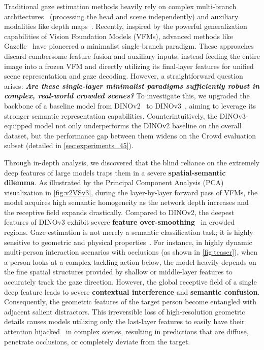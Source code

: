 \documentclass[sigconf,review,anonymous,screen]{acmart}
\begin{document}
Traditional gaze estimation methods heavily rely on complex multi-branch architectures~\cite{chong2020detecting,chen2021gaze,saran2018human,hu2022gaze,recasens2017following,wang2022gatector,zhao2020learning} (processing the head and scene independently) and auxiliary modalities like depth maps~\cite{bao2022escnet,horanyi2023they,tonini2022multimodal,guan2019enhanced}. Recently, inspired by the powerful generalization capabilities of Vision Foundation Models (VFMs), advanced methods like Gazelle~\cite{ryan2025gaze} have pioneered a minimalist single-branch paradigm. These approaches discard cumbersome feature fusion and auxiliary inputs, instead feeding the entire image into a frozen VFM and directly utilizing its final-layer features for unified scene representation and gaze decoding. However, a straightforward question arises: \textbf{\textit{Are these single-layer minimalist paradigms sufficiently robust in complex, real-world crowded scenes?}} To investigate this, we upgraded the backbone of a baseline model from DINOv2~\cite{oquab2023dinov2} to DINOv3~\cite{simeoni2025dinov3}, aiming to leverage its stronger semantic representation capabilities. Counterintuitively, the DINOv3-equipped model not only underperforms the DINOv2 baseline on the overall dataset, but the performance gap between them widens on the Crowd evaluation subset (detailed in \autoref{sec:experiments_45}).

Through in-depth analysis, we discovered that the blind reliance on the extremely deep features of large models traps them in a severe \textbf{spatial-semantic dilemma}. As illustrated by the Principal Component Analysis (PCA) visualization in \autoref{fig:v2VSv3}, during the layer-by-layer forward pass of VFMs, the model acquires high semantic homogeneity as the network depth increases and the receptive field expands drastically. Compared to DINOv2, the deepest features of DINOv3 exhibit severe \textbf{feature over-smoothing}~\cite{xie2023revealing} in crowded regions. Gaze estimation is not merely a semantic classification task; it is highly sensitive to geometric and physical properties~\cite{zhang2015appearance}. For instance, in highly dynamic multi-person interaction scenarios with occlusions (as shown in \autoref{fig:teaser}), when a person looks at a complex tackling action below, the model heavily depends on the fine spatial structures provided by shallow or middle-layer features to accurately track the gaze direction. However, the global receptive field of a single deep feature leads to severe \textbf{contextual interference} and \textbf{semantic confusion}. Consequently, the geometric features of the target person become entangled with adjacent salient distractors. This irreversible loss of high-resolution geometric details causes models utilizing only the last-layer features to easily have their attention hijacked~\cite{tafasca2024sharingan} in complex scenes, resulting in predictions that are diffuse, penetrate occlusions, or completely deviate from the target.
\end{document}
